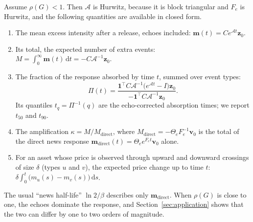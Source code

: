 \begin{corollary}\label{cor:abs}
Assume $\rho(G)<1$. Then $\mathcal A$ is Hurwitz, because it is block triangular and $F_e$ is
Hurwitz, and the following quantities are available in closed form.
\begin{enumerate}
\item The mean excess intensity after a release, echoes included: $\bm m(t)=Ce^{\mathcal At}\bm z_0$.
\item Its total, the expected number of extra events: $M=\int_0^\infty\bm m(t)\,\mathrm{d}t=-C\mathcal A^{-1}\bm z_0$.
\item The fraction of the response absorbed by time $t$, summed over event types:
\[
\Pi(t)=\frac{\bm 1^\top C\mathcal A^{-1}\bigl(e^{\mathcal At}-I\bigr)\bm z_0}{-\bm 1^\top C\mathcal A^{-1}\bm z_0}.
\]
Its quantiles $t_q=\Pi^{-1}(q)$ are the echo-corrected absorption times; we report $t_{50}$ and $t_{90}$.
\item The amplification $\kappa=M/M_{\mathrm{direct}}$, where $M_{\mathrm{direct}}=-\Theta_eF_e^{-1}\bm v_0$
is the total of the direct news response $\bm m_{\mathrm{direct}}(t)=\Theta_e e^{F_et}\bm v_0$ alone.
\item For an asset whose price is observed through upward and downward crossings of size $\delta$
(types $u$ and $v$), the expected price change up to time $t$:
$\delta\int_0^t\bigl(m_u(s)-m_v(s)\bigr)\,\mathrm{d}s$.
\end{enumerate}
\end{corollary}

The usual ``news half-life'' $\ln 2/\beta$ describes only $\bm m_{\mathrm{direct}}$. When $\rho(G)$
is close to one, the echoes dominate the response, and Section~\ref{sec:application} shows that
the two can differ by one to two orders of magnitude.

